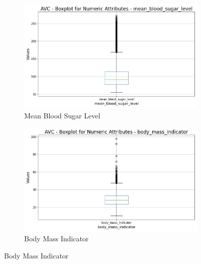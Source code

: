 \documentclass[a4paper,12pt]{article}
\begin{document}
\begin{figure}[h!]
    \begin{subfigure}[b]{0.45\textwidth}
        \centering
        \includegraphics[width=\textwidth]{Resources/Boxplot_blood_sugar_level.jpeg}
        \caption{Mean Blood Sugar Level}
        \label{fig:blood_sugar_level}
    \end{subfigure}
    \hfill
    \begin{subfigure}[b]{0.45\textwidth}
        \centering
        \includegraphics[width=\textwidth]{Resources/Boxplot_body_mass_indicator.jpeg}
        \caption{Body Mass Indicator}
        \label{fig:body_mass_indicator}
    \end{subfigure}
    
    \vspace{0.5cm}
    

\end{figure}
\end{document}
